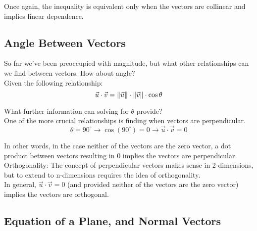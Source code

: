 Once again, the inequality is equivalent only when the vectors are collinear and implies linear dependence.


\subsection{Angle Between Vectors}\label{concept2.5}
So far we've been preoccupied with magnitude, but what other relationships can we find between vectors. How about angle?
\\

Given the following relationship:
\begin{equation}
	\vec{u} \cdot \vec{v} = \left\Vert \vec{u} \right\Vert \cdot \left\Vert \vec{v} \right\Vert \cdot \cos \theta
\end{equation}

What further information can solving for $\theta$ provide?
\\

One of the more crucial relationships is finding when vectors are perpendicular.
\begin{equation}
	\theta = 90^\circ \longrightarrow
	\cos (90^\circ) = 0 \longrightarrow
	\vec{u} \cdot \vec{v} = 0
\end{equation}

In other words, in the case neither of the vectors are the zero vector, a dot product between vectors resulting in 0 implies the vectors are perpendicular.
\\

Orthogonality: The concept of perpendicular vectors makes sense in 2-dimensions, but to extend to n-dimensions requires the idea of orthogonality.
\\

In general, $\vec{u} \cdot \vec{v} = 0$ (and provided neither of the vectors are the zero vector) implies the vectors are orthogonal.


\subsection{Equation of a Plane, and Normal Vectors}\label{concept2.6}